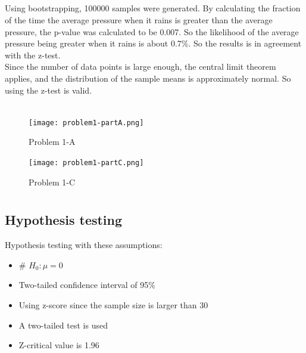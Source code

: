 \documentclass[12pt]{article}
\begin{document}
\subsection{}\label{subsec:problem-1-c}
Using bootstrapping, 100000 samples were generated.
By calculating the fraction of the time the average pressure when it rains is greater than the average pressure, the p-value was calculated to be 0.007.
So the likelihood of the average pressure being greater when it rains is about 0.7\%.
So the results is in agreement with the z-test.\\
Since the number of data points is large enough, the central limit theorem applies, and the distribution of the sample means is approximately normal.
So using the z-test is valid.\\
\\

\begin{figure}
\begin{center}
\texttt{[image: problem1-partA.png]}
\caption{Problem 1-A}
\end{center}
\end{figure}

\begin{figure}
\begin{center}
\texttt{[image: problem1-partC.png]}
\caption{Problem 1-C}
\end{center}
\end{figure}

\newpage
\section{}\label{sec:problem-2}
\subsection{Hypothesis testing}\label{subsec:problem-2-a}
Hypothesis testing with these assumptions:
    \begin{itemize}
        \item # $H_0: \mu = 0$
        \item Two-tailed confidence interval of 95\%
        \item Using z-score since the sample size is larger than 30
        \item A two-tailed test is used
        \item Z-critical value is 1.96
        \end{itemize}
\end{document}
